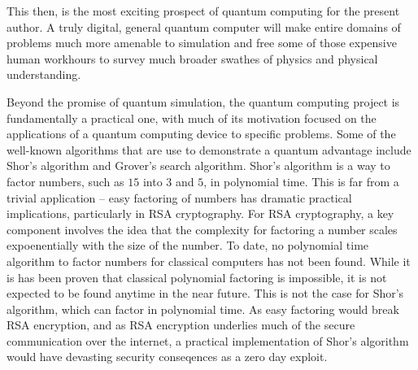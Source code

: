 This then, is the most exciting prospect of quantum computing for the present
author. A truly digital, general quantum computer will make entire domains of
problems much more amenable to simulation and free some of those expensive human
workhours to survey much broader swathes of physics and physical understanding.

Beyond the promise of quantum simulation, the quantum computing project is
fundamentally a practical one, with much of its motivation focused on the
applications of a quantum computing device to specific problems. Some of the
well-known algorithms that are use to demonstrate a quantum advantage include
Shor's algorithm\cite{Shor} and Grover's search algorithm\cite{Grover}. Shor's
algorithm is a way to factor numbers, such as $15$ into $3$ and $5$, in
polynomial time. This is far from a trivial application -- easy factoring of
numbers has dramatic practical implications, particularly in RSA
cryptography\cite{RSA}. For RSA cryptography, a key component involves the idea
that the complexity for factoring a number scales expoenentially with the size
of the number. To date, no polynomial time algorithm to factor numbers for
classical computers has not been found. While it is has been proven that
classical polynomial factoring is impossible, it is not expected to be found
anytime in the near future. This is not the case for Shor's algorithm, which can
factor in polynomial time. As easy factoring would break RSA encryption, and as
RSA encryption underlies much of the secure communication over the internet, a
practical implementation of Shor's algorithm would have devasting security
conseqences as a zero day exploit.